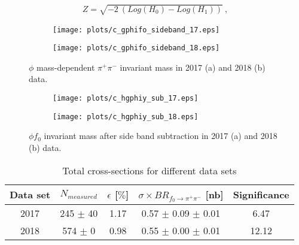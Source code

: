 \begin{equation}
    \label{eq.4.5.4}
    \begin{aligned}
        Z = \sqrt{-2 ~(Log(H_{0}) - Log(H_{1}))}~,
    \end{aligned}
\end{equation}

\begin{figure}[H]
    \centering
    \begin{subfigure}[b]{0.45\textwidth}
        \texttt{[image: plots/c\_gphifo\_sideband\_17.eps]}
        \caption{}
        \label{fig.4.5.4.1.a}
    \end{subfigure}
    \begin{subfigure}[b]{0.45\textwidth}
        \texttt{[image: plots/c\_gphifo\_sideband\_18.eps]}
        \caption{}
        \label{fig.4.5.4.1.b}
    \end{subfigure}
    \caption{$\phi$ mass-dependent $\pi^+ \pi^-$ invariant mass in 2017 (a) and 2018 (b) data.}
    \label{fig.4.5.4.1}
\end{figure}

\begin{figure}[H]
    \centering
    \begin{subfigure}[b]{0.45\textwidth}
        \texttt{[image: plots/c\_hgphiy\_sub\_17.eps]}
        \caption{}
        \label{fig.4.5.4.2.a}
    \end{subfigure}
    \begin{subfigure}[b]{0.45\textwidth}
        \texttt{[image: plots/c\_hgphiy\_sub\_18.eps]}
        \caption{}
        \label{fig.4.5.4.2.b}
    \end{subfigure}
    \caption{$\phi f_0$ invariant mass after side band subtraction in 2017 (a) and 2018 (b) data.}
    \label{fig:4.5.4.2}
\end{figure}

\begin{table}[!htbp]
    \centering
    \caption{Total cross-sections for different data sets}
    \label{tab.4.5.4}
    \begin{tabular}{|c|c|c|c|c|}
        \hline
        Data set & $N_{measured}$ & $\epsilon$ [$\%$] & $\sigma \times BR_{f_{0}\rightarrow\pi^{+}\pi^{-}}$ [nb] & Significance\\
        \hline
        2017 & 245 $\pm$ 40 & 1.17 & 0.57 $\pm$ 0.09 $\pm$ 0.01 & 6.47 \\
        \hline
        2018 & 574 $\pm$ 0 & 0.98 & 0.55 $\pm$ 0.00 $\pm$ 0.01 & 12.12 \\
        \hline
    \end{tabular}
\end{table}

